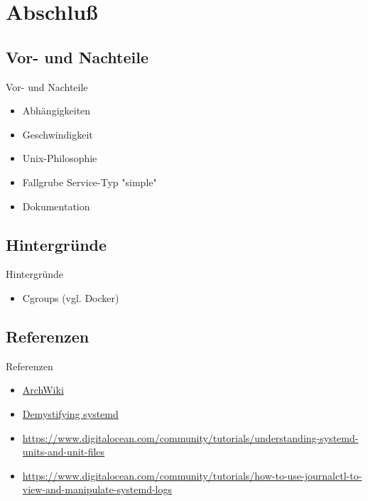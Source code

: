 \section{Abschluß}
\subsection{Vor- und Nachteile}

\begin{frame}{Vor- und Nachteile}
\begin{itemize}
\item[\goodsmile] Abhängigkeiten
\item[\goodsmile] Geschwindigkeit
\item[\neutralsmile] Unix-Philosophie	
\item[\sadsmile] Fallgrube Service-Typ "simple"
\item[\sadsmile] Dokumentation
\end{itemize}
\end{frame}

\subsection{Hintergründe}

\begin{frame}{Hintergründe}
  \begin{itemize}
    \item Cgroups (vgl. Docker)
  \end{itemize}
\end{frame}

\subsection{Referenzen}

\begin{frame}{Referenzen}
\begin{itemize}	
	\item \href{https://wiki.archlinux.org/index.php/systemd}{ArchWiki}

	\item \href{https://www.redhat.com/files/summit/session-assets/2017/S103870-Demystifying-systemd.pdf}{Demystifying systemd}
	\item \href{https://www.digitalocean.com/community/tutorials/understanding-systemd-units-and-unit-files}{https://www.digitalocean.com/community/tutorials/understanding-systemd-units-and-unit-files}

	\item \href{https://www.digitalocean.com/community/tutorials/how-to-use-journalctl-to-view-and-manipulate-systemd-logs}{https://www.digitalocean.com/community/tutorials/how-to-use-journalctl-to-view-and-manipulate-systemd-logs}
\end{itemize}
\end{frame}



